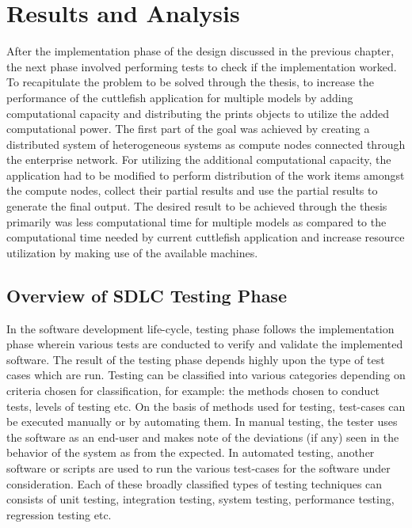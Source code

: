 \chapter{Results and Analysis} \label{RSA}

After the implementation phase of the design discussed in the previous chapter, the next phase involved performing tests to check if the implementation worked. To recapitulate the problem to be solved through the thesis, to increase the performance of the cuttlefish application for multiple models by adding computational capacity and distributing the prints objects to utilize the added computational power. The first part of the goal was achieved by creating a distributed system of heterogeneous systems as compute nodes connected through the enterprise network. For utilizing the additional computational capacity, the application had to be modified to perform distribution of the work items amongst the compute nodes, collect their partial results and use the partial results to generate the final output. The desired result to be achieved through the thesis primarily was less computational time for multiple models as compared to the computational time needed by current cuttlefish application and increase resource utilization by making use of the available machines.\newline

\section{Overview of SDLC Testing Phase} \label{SDLCTesting}

In the software development life-cycle, testing phase follows the implementation phase wherein various tests are conducted to verify and validate the implemented software. The result of the testing phase depends highly upon the type of test cases which are run. Testing can be classified into various categories depending on criteria chosen for classification, for example: the methods chosen to conduct tests, levels of testing etc. On the basis of methods used for testing, test-cases can be executed manually or by automating them. In manual testing, the tester uses the software as an end-user and makes note of the deviations (if any) seen in the behavior of the system as from the expected. In automated testing, another software or scripts are used to run the various test-cases for the software under consideration. Each of these broadly classified types of testing techniques can consists of unit testing, integration testing, system testing, performance testing, regression testing etc.\newline

